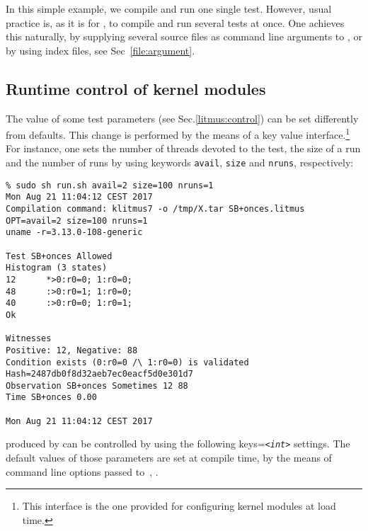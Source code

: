 In this simple example, we compile and run one single test.
However, usual practice is, as it is for \litmus{}, to compile and run
several tests at once.
One achieves this naturally, by supplying several source files as command
line arguments to \klitmus,
or by using index files, see Sec~\ref{file:argument}.

\subsection{Runtime control of kernel modules}
The value of some test parameters
(see Sec.\ref{litmus:control}) can be set differently from defaults.
This change is performed by the means
of a key value interface.\footnote{This interface is the one provided for
configuring kernel modules at load time.}
For instance, one sets the number of threads devoted
to the test, the size of a run
and the number of runs by using keywords \texttt{avail},
\texttt{size} and \texttt{nruns}, respectively:
\begin{verbatim}
% sudo sh run.sh avail=2 size=100 nruns=1
Mon Aug 21 11:04:12 CEST 2017
Compilation command: klitmus7 -o /tmp/X.tar SB+onces.litmus
OPT=avail=2 size=100 nruns=1
uname -r=3.13.0-108-generic

Test SB+onces Allowed
Histogram (3 states)
12      *>0:r0=0; 1:r0=0;
48      :>0:r0=1; 1:r0=0;
40      :>0:r0=0; 1:r0=1;
Ok

Witnesses
Positive: 12, Negative: 88
Condition exists (0:r0=0 /\ 1:r0=0) is validated
Hash=2487db0f8d32aeb7ec0eacf5d0e301d7
Observation SB+onces Sometimes 12 88
Time SB+onces 0.00

Mon Aug 21 11:04:12 CEST 2017
\end{verbatim}

produced by \klitmus{} can be controlled by
using the following keys=\texttt{\em{<int>}} settings.
The default values of those parameters are set at compile time,
by the means of command line options passed to~\klitmus,
.

